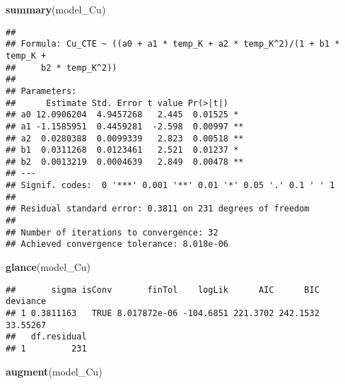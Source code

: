 \documentclass[]{book}
\newenvironment{Shaded}{\begin{snugshade}}{\end{snugshade}}
\newcommand{\KeywordTok}[1]{\textcolor[rgb]{0.13,0.29,0.53}{\textbf{#1}}}
\newcommand{\NormalTok}[1]{#1}
\theoremstyle{definition}
\theoremstyle{definition}
\theoremstyle{definition}
\theoremstyle{remark}
\begin{document}
\begin{Shaded}
\begin{Highlighting}[]
\KeywordTok{summary}\NormalTok{(model_Cu)}
\end{Highlighting}
\end{Shaded}

\begin{verbatim}
## 
## Formula: Cu_CTE ~ ((a0 + a1 * temp_K + a2 * temp_K^2)/(1 + b1 * temp_K + 
##     b2 * temp_K^2))
## 
## Parameters:
##      Estimate Std. Error t value Pr(>|t|)   
## a0 12.0906204  4.9457268   2.445  0.01525 * 
## a1 -1.1585951  0.4459281  -2.598  0.00997 **
## a2  0.0280388  0.0099339   2.823  0.00518 **
## b1  0.0311268  0.0123461   2.521  0.01237 * 
## b2  0.0013219  0.0004639   2.849  0.00478 **
## ---
## Signif. codes:  0 '***' 0.001 '**' 0.01 '*' 0.05 '.' 0.1 ' ' 1
## 
## Residual standard error: 0.3811 on 231 degrees of freedom
## 
## Number of iterations to convergence: 32 
## Achieved convergence tolerance: 8.018e-06
\end{verbatim}

\begin{Shaded}
\begin{Highlighting}[]
\KeywordTok{glance}\NormalTok{(model_Cu)}
\end{Highlighting}
\end{Shaded}

\begin{verbatim}
##       sigma isConv       finTol    logLik      AIC      BIC deviance
## 1 0.3811163   TRUE 8.017872e-06 -104.6851 221.3702 242.1532 33.55267
##   df.residual
## 1         231
\end{verbatim}

\begin{Shaded}
\begin{Highlighting}[]
\KeywordTok{augment}\NormalTok{(model_Cu)}
\end{Highlighting}
\end{Shaded}
\end{document}
